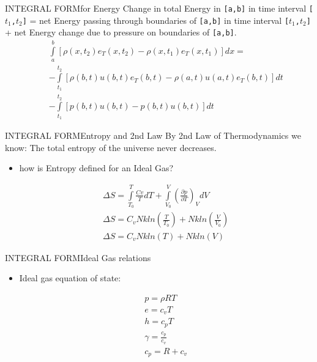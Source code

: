 \documentclass{beamer}
\begin{document}
\begin{frame}{INTEGRAL FORM}{for Energy}
  Change in total Energy in \texttt{[a,b]} in time interval \texttt{[$t_1$,$t_2$]} = net Energy passing through boundaries of \texttt{[a,b]} in time interval \texttt{[$t_1$,$t_2$]} + net Energy change due to pressure on boundaries of \texttt{[a,b]}.
  \begin{eqnarray}\nonumber
    && \int\limits_a^b[\rho(x,t_2)e_T(x,t_2)-\rho(x,t_1)e_T(x,t_1)]dx = \nonumber \\
    && -\int\limits_{t_1}^{t_2}[\rho(b,t)u(b,t)e_T(b,t)-\rho(a,t)u(a,t)e_T(b,t)]dt \nonumber \\
    && -\int\limits_{t_1}^{t_2}[p(b,t)u(b,t)-p(b,t)u(b,t)]dt 
  \end{eqnarray}
\end{frame}

\begin{frame}{INTEGRAL FORM}{Entropy and 2nd Law}
  By 2nd Law of Thermodynamics we know: The total entropy of the universe never decreases.
  \begin{itemize}
   \item how is Entropy defined for an Ideal Gas?
  \end{itemize}
  \begin{eqnarray}
    &&{\Delta}S=\int\limits_{T_0}^T \frac{Cv}{T}dT+\int\limits_{V_0}^{V} \left(\frac{\partial{p}}{\partial{T}}\right)_VdV \nonumber \\
    &&{\Delta}S=C_vNkln\left(\frac{T}{T_0}\right)+Nkln\left(\frac{V}{V_0}\right)\nonumber \\
    &&{\Delta}S=C_vNkln(T)+Nkln(V) \nonumber
  \end{eqnarray}
\end{frame}

\begin{frame}{INTEGRAL FORM}{Ideal Gas relations}
  \begin{itemize}
   \item Ideal gas equation of state:
  \end{itemize}
  \begin{eqnarray}
    && p={\rho}RT \nonumber \\
    && e = c_v T \nonumber \\
    && h = c_p T \nonumber \\
    && \gamma = \frac{c_p}{c_v} \nonumber \\
    && c_p = R + c_v \nonumber 
  \end{eqnarray}
\end{frame}
\end{document}
